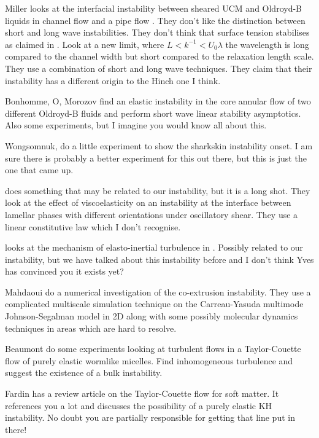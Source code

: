 \documentclass{jfm}
\begin{document}
Miller  looks at the interfacial instability between sheared UCM and Oldroyd-B
liquids in channel flow \citep{Miller2007a} and a pipe flow
\citep{Miller2007b}. They don't like the distinction between short and long
wave instabilities. They don't think that surface tension stabilises as claimed
in \citep{Chen1992b}. Look at a new limit, where $L < k^{-1} < U_{0} \lambda$
the wavelength is long compared to the channel width but short compared to the
relaxation length scale. They use a combination of short and long wave
techniques. They claim that their instability has a different origin to the
Hinch one I think.

Bonhomme, O, Morozov \citep{Bonhomme2011} find an elastic instability in the
core annular flow of two different Oldroyd-B fluids and perform short wave
linear stability asymptotics. Also some experiments, but I imagine you would
know all about this.

Wongsomnuk, \citep{Wongsomnuk2000} do a little experiment to show the sharkskin
instability onset. I am sure there is probably a better experiment for this out
there, but this is just the one that came up.

\citet{Yoo2013} does something that may be related to our instability, but
it is a long shot. They look at the effect of viscoelasticity on an instability
at the interface between lamellar phases with different orientations under
oscillatory shear.  They use a linear constitutive law which I don't recognise.

\citet{Dubief2013} looks at the mechanism of elasto-inertial
turbulence in \citet{Samanta2013}. Possibly related to our instability,
but we have talked about this instability before and I don't think Yves has
convinced you it exists yet?

Mahdaoui \citep{Mahdaoui2013} do a numerical investigation of the co-extrusion
instability. They use a complicated multiscale simulation technique on the
Carreau-Yasuda multimode Johnson-Segalman model in 2D along with some possibly
molecular dynamics techniques in areas which are hard to resolve.

Beaumont \citep{Beaumont2013} do some experiments looking at turbulent flows in
a Taylor-Couette flow of purely elastic wormlike micelles. Find inhomogeneous
turbulence and suggest the existence of a bulk instability.

Fardin \citep{Fardin2014} has a review article on the Taylor-Couette flow for
soft matter. It references you a lot and discusses the possibility of a purely
elastic KH instability. No doubt you are partially responsible for getting that
line put in there!
\end{document}
